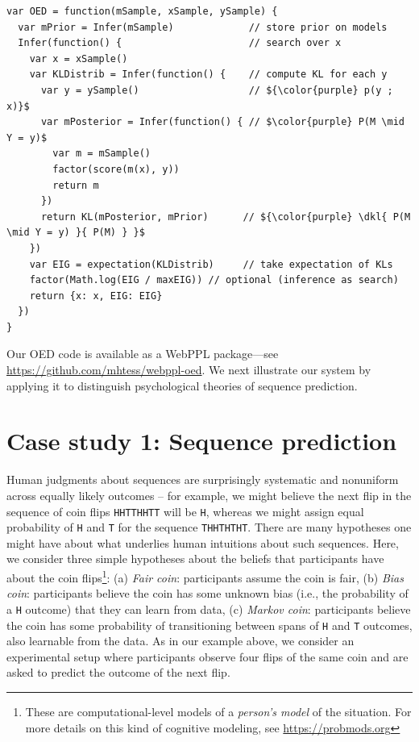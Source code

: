 \documentclass{article}
\newcommand{\dkl}{D_\mathrm{KL}\infdivx}
\begin{document}
\begin{lstlisting}[mathescape, label={code:oed-pp}, caption = {OED implementation. For clarity, we have omitted some book-keeping details.}]
var OED = function(mSample, xSample, ySample) {
  var mPrior = Infer(mSample)             // store prior on models
  Infer(function() {                      // search over x
    var x = xSample()
    var KLDistrib = Infer(function() {    // compute KL for each y
      var y = ySample()                   // ${\color{purple} p(y ; x)}$
      var mPosterior = Infer(function() { // $\color{purple} P(M \mid Y = y)$
        var m = mSample()
        factor(score(m(x), y))
        return m
      })
      return KL(mPosterior, mPrior)      // ${\color{purple} \dkl{ P(M \mid Y = y) }{ P(M) } }$
    })
    var EIG = expectation(KLDistrib)     // take expectation of KLs
    factor(Math.log(EIG / maxEIG)) // optional (inference as search)
    return {x: x, EIG: EIG}
  })
}
\end{lstlisting}
Our OED code is available as a WebPPL package---see \url{https://github.com/mhtess/webppl-oed}.
We next illustrate our system by applying it to distinguish psychological theories of sequence prediction.

\section{Case study 1: Sequence prediction}
\label{s:tutorial}

Human judgments about sequences are surprisingly systematic and nonuniform across equally likely outcomes -- for example, we might believe the next flip in the  sequence of coin flips \lstinline{HHTTHHTT} will be \lstinline{H}, whereas we might assign equal probability of \lstinline{H} and \lstinline{T} for the sequence \lstinline{THHTHTHT}.
There are many hypotheses one might have about what underlies human intuitions about such sequences.
Here, we consider three simple hypotheses about the beliefs that participants have about the coin flips\footnote{These are computational-level models of a \emph{person's model} of the situation. For more details on this kind of cognitive modeling, see \url{https://probmods.org}}: (a) \emph{Fair coin}: participants assume the coin is fair, (b) \emph{Bias coin}: participants believe the coin has some unknown bias (i.e., the probability of a \lstinline{H} outcome) that they can learn from data, (c) \emph{Markov coin}: participants believe the coin has some probability of transitioning between spans of \lstinline{H} and \lstinline{T} outcomes, also learnable from the data.
As in our example above, we consider an experimental setup where participants observe four flips of the same coin and are asked to predict the outcome of the next flip.
\end{document}
